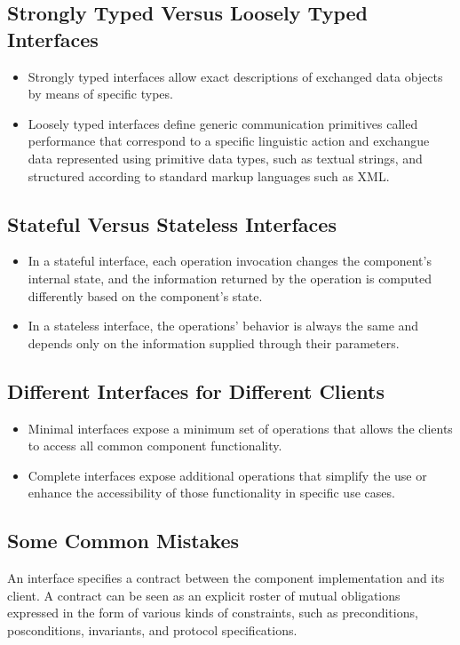 \documentclass[letterpaper, 10 pt, conference]{ieeeconf}
\begin{document}
\subsection{Strongly Typed Versus Loosely Typed Interfaces}
\begin{itemize}
\item Strongly typed interfaces allow exact descriptions of exchanged data objects by means of specific types.
\item Loosely typed interfaces define generic communication primitives called performance that correspond to a specific linguistic action and exchangue data represented using primitive data types, such as textual strings, and structured according to standard markup languages such as XML.
\end{itemize}

\subsection{Stateful Versus Stateless Interfaces}
\begin{itemize}
\item In a stateful interface, each operation invocation changes the component's internal state, and the information returned by the operation is computed differently based on the component's state.
\item In a stateless interface, the operations' behavior is always the same and depends only on the information supplied through their parameters.
\end{itemize}

\subsection{Different Interfaces for Different Clients}
\begin{itemize}
\item Minimal interfaces expose a minimum set of operations that allows the clients to access all common component functionality.
\item Complete interfaces expose additional operations that simplify the use or enhance the accessibility of those functionality in specific use cases.
\end{itemize}

\subsection{Some Common Mistakes}
An interface specifies a contract between the component implementation and its client. A contract can be seen as an explicit roster of mutual obligations expressed in the form of various kinds of constraints, such as preconditions, posconditions, invariants, and protocol specifications.
\end{document}
